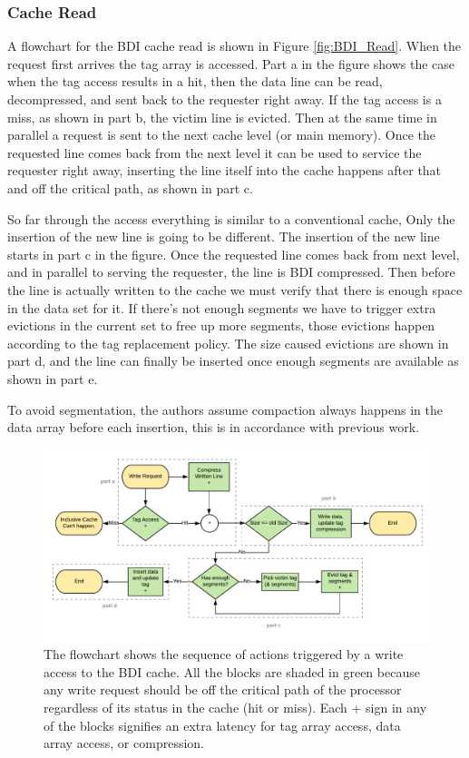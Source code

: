 \subsubsection{Cache Read}
A flowchart for the BDI cache read is shown in Figure \ref{fig:BDI_Read}. When the request first arrives the tag array is accessed. Part a in the figure shows the case when the tag access results in a hit, then the data line can be read, decompressed, and sent back to the requester right away. If the tag access is a miss, as shown in part b, the victim line is evicted. Then at the same time in parallel a request is sent to the next cache level (or main memory). Once the requested line comes back from the next level it can be used to service the requester right away, inserting the line itself into the cache happens after that and off the critical path, as shown in part c.\par
So far through the access everything is similar to a conventional cache, Only the insertion of the new line is going to be different. The insertion of the new line starts in part c in the figure. Once the requested line comes back from next level, and in parallel to serving the requester, the line is BDI compressed. Then before the line is actually written to the cache we must verify that there is enough space in the data set for it. If there's not enough segments we have to trigger extra evictions in the current set to free up more segments, those evictions happen according to the tag replacement policy. The size caused evictions are shown in part d, and the line can finally be inserted once enough segments are available as shown in part e.\par
To avoid segmentation, the authors assume compaction always happens in the data array before each insertion, this is in accordance with previous work.
\begin{figure}[h]
    \includegraphics[width=\textwidth]{BDI_Write.pdf}
    \caption[BDI Write]{The flowchart shows the sequence of actions triggered by a write access to the BDI cache. All the blocks are shaded in green because any write request should be off the critical path of the processor regardless of its status in the cache (hit or miss). Each + sign in any of the blocks signifies an extra latency for tag array access, data array access, or compression.}
    \label{fig:BDI_Write}
\end{figure}
